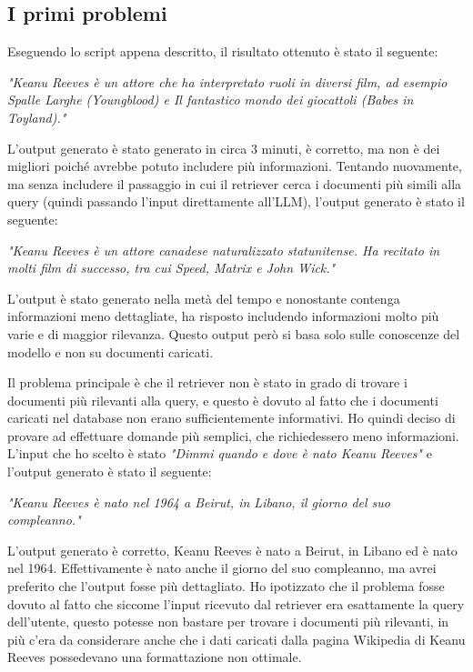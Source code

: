 \subsection{I primi problemi}
Eseguendo lo script appena descritto, il risultato ottenuto è stato il seguente:
\begin{center}
    \textit{"Keanu Reeves è un attore che ha interpretato ruoli in diversi film, ad esempio Spalle Larghe (Youngblood) e Il fantastico mondo dei giocattoli (Babes in Toyland)."}
\end{center}
L'output generato è stato generato in circa 3 minuti, è corretto, ma non è dei migliori poiché avrebbe potuto includere più informazioni. Tentando nuovamente, ma senza includere il passaggio in cui il retriever cerca i documenti più simili alla query (quindi passando l'input direttamente all'LLM), l'output generato è stato il seguente:
\begin{center}
    \textit{"Keanu Reeves è un attore canadese naturalizzato statunitense. Ha recitato in molti film di successo, tra cui Speed, Matrix e John Wick."}
\end{center}
L'output è stato generato nella metà del tempo e nonostante contenga informazioni meno dettagliate, ha risposto includendo informazioni molto più varie e di maggior rilevanza. Questo output però si basa solo sulle conoscenze del modello e non su documenti caricati.

Il problema principale è che il retriever non è stato in grado di trovare i documenti più rilevanti alla query, e questo è dovuto al fatto che i documenti caricati nel database non erano sufficientemente informativi. Ho quindi deciso di provare ad effettuare domande più semplici, che richiedessero meno informazioni. L'input che ho scelto è stato \textit{"Dimmi quando e dove è nato Keanu Reeves"} e l'output generato è stato il seguente:
\begin{center}
    \textit{"Keanu Reeves è nato nel 1964 a Beirut, in Libano, il giorno del suo compleanno."}
\end{center}
L'output generato è corretto, Keanu Reeves è nato a Beirut, in Libano ed è nato nel 1964. Effettivamente è nato anche il giorno del suo compleanno, ma avrei preferito che l'output fosse più dettagliato. Ho ipotizzato che il problema fosse dovuto al fatto che siccome l'input ricevuto dal retriever era esattamente la query dell'utente, questo potesse non bastare per trovare i documenti più rilevanti, in più c'era da considerare anche che i dati caricati dalla pagina Wikipedia di Keanu Reeves possedevano una formattazione non ottimale.

